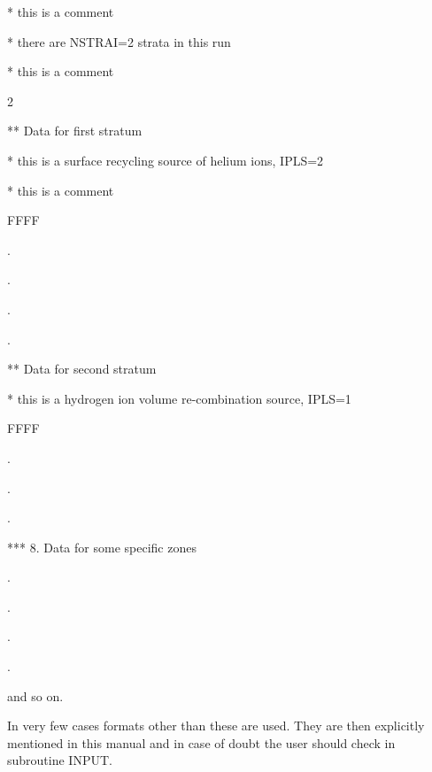 * this is a comment

* there are NSTRAI=2 strata in this run

* this is a comment

 2

** Data for first stratum

* this is a surface recycling source of helium ions, IPLS=2

* this is a comment

FFFF

  .

  .

  .

  .

** Data for second stratum

* this is a hydrogen ion volume re-combination source, IPLS=1

FFFF

  .

  .

  .

*** 8. Data for some specific zones

  .

  .

  .

  .

and so on.

\medskip

In very few cases formats other than these are used. They are then
explicitly mentioned in this manual and in case of doubt the user
should check in subroutine INPUT.
\newpage
